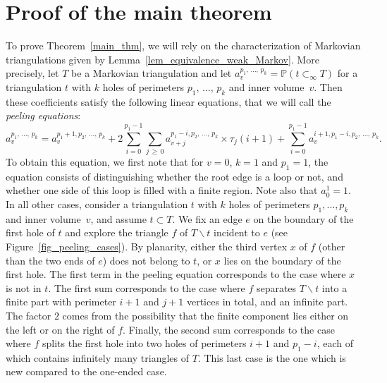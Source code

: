 \documentclass[AHL,Unicode,longabstracts,published]{cedram}
\renewcommand{\P}{\mathbb{P}}
\begin{document}
\section{Proof of the main theorem}
To prove Theorem~\ref{main_thm}, we will rely on the characterization of Markovian triangulations given by Lemma~\ref{lem_equivalence_weak_Markov}. More precisely, let $T$ be a Markovian triangulation and let $a^{p_1,\,\dots,\,p_k}_v=\P \left(t \subset_{\infty} T \right)$ for a triangulation $t$ with $k$ holes of perimeters $p_1,\,\dots,\, p_k$ and inner volume~$v$. Then these coefficients satisfy the following linear equations, that we will call the \emph{peeling equations}:
\[
a^{p_1,\,\dots,\,p_k}_v = a^{p_1+1,p_2,\,\dots,\,p_k}_{v} + 2 \sum_{i=0}^{p_1-1} \sum_{j\,\geq\,0} a^{p_1-i,p_2,\,\dots,\,p_k}_{v+j} \times \tau_j(i+1) + \sum_{i=0}^{p_1-1} a^{i+1, p_1-i, p_2,\,\dots,\,p_k}_{v}.
\]
To obtain this equation, we first note that for $v=0$, $k=1$ and $p_1=1$, the equation consists of distinguishing whether the root edge is a loop or not, and whether one side of this loop is filled with a finite region. Note also that $a^1_0=1$. In all other cases, consider a triangulation $t$ with $k$ holes of perimeters $p_1, \dots, p_k$ and inner volume~$v$, and assume $t \subset T$. We fix an edge $e$ on the boundary of the first hole of $t$ and explore the triangle $f$ of $T \backslash t$ incident to $e$ (see Figure~\ref{fig_peeling_cases}). By planarity, either the third vertex $x$ of $f$ (other than the two ends of $e$) does not belong to $t$, or $x$ lies on the boundary of the first hole. The first term in the peeling equation corresponds to the case where $x$ is not in $t$. The first sum corresponds to the case where $f$ separates $T \backslash t$ into a finite part with perimeter $i+1$ and $j+1$ vertices in total, and an infinite part. The factor $2$ comes from the possibility that the finite component lies either on the left or on the right of $f$. Finally, the second sum corresponds to the case where $f$ splits the first hole into two holes of perimeters $i+1$ and $p_1-i$, each of which contains infinitely many triangles of $T$. This last case is the one which is new compared to the one-ended case.
\end{document}

